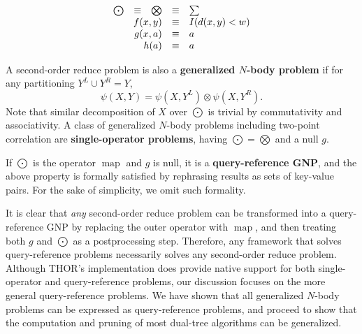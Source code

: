 \documentclass[twoside,leqno,twocolumn]{article}
\newcommand{\union}{\cup}
\DeclareMathOperator*{\map}{map}
\newcommand{\gnp}{\psi}
\newcommand{\defterm}[1]{{\bf #1}}
\newcommand{\kdleft}[1]{#1^{\!L}}
\newcommand{\kdright}[1]{#1^{\!R}}
\begin{document}
\[\begin{array}{ccccl}
  \bigodot &\equiv& \bigotimes &\equiv& \sum
  \\
  \multicolumn{3}{r}{f(x,y)} &\equiv& I(d(x,y) < w)
  \\
  \multicolumn{3}{r}{g(x, a)} &\equiv& a
  \\
  \multicolumn{3}{r}{h(a)} &\equiv& a
\end{array}\]

A second-order reduce problem is also a \defterm{generalized $N$-body problem} if for any partitioning $\kdleft{Y} \union \kdright{Y} = Y$,
\[\gnp(X,Y) = \gnp(X,\kdleft{Y}) \otimes \gnp(X,\kdright{Y}).\]
\noindent Note that similar decomposition of $X$ over $\bigodot$ is trivial by commutativity and associativity.
A class of generalized $N$-body problems including two-point correlation are \defterm{single-operator problems}, having $\bigodot = \bigotimes$ and a null $g$.

If $\bigodot$ is the operator $\map$ and $g$ is null, it is a \defterm{query-reference GNP}, and the above property is formally satisfied by rephrasing results as sets of key-value pairs.
For the sake of simplicity, we omit such formality.

It is clear that {\em any} second-order reduce problem can be transformed into a query-reference GNP by replacing the outer operator with $\map$, and then treating both $g$ and $\bigodot$ as a postprocessing step.
Therefore, any framework that solves query-reference problems necessarily solves any second-order reduce problem.
Although THOR's implementation does provide native support for both single-operator and query-reference problems, our discussion focuses on the more general query-reference problems.
We have shown that all generalized $N$-body problems can be expressed as query-reference problems, and proceed to show that the computation and pruning of most dual-tree algorithms can be generalized.
\end{document}
